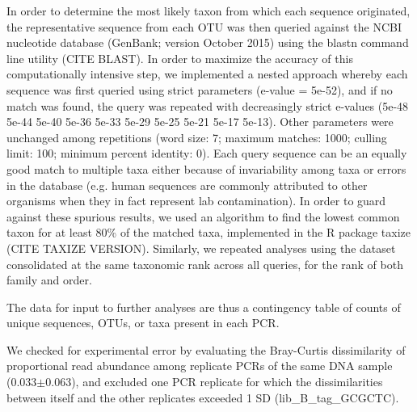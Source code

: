 \documentclass[11pt,letterpaper]{article} %
\begin{document}
In order to determine the most likely taxon from which each sequence originated, the representative sequence from each OTU was then queried against the NCBI nucleotide database (GenBank; version October 2015) using the blastn command line utility (CITE BLAST).
In order to maximize the accuracy of this computationally intensive step, we implemented a nested approach whereby each sequence was first queried using strict parameters (e-value = 5e-52), and if no match was found, the query was repeated with decreasingly strict e-values (5e-48 5e-44 5e-40 5e-36 5e-33 5e-29 5e-25 5e-21 5e-17 5e-13).
Other parameters were unchanged among repetitions (word size: 7; maximum matches: 1000; culling limit: 100; minimum percent identity: 0).
Each query sequence can be an equally good match to multiple taxa either because of invariability among taxa or errors in the database (e.g. human sequences are commonly attributed to other organisms when they in fact represent lab contamination).
In order to guard against these spurious results, we used an algorithm to find the lowest common taxon for at least 80\% of the matched taxa, implemented in the R package taxize (CITE TAXIZE VERSION).
Similarly, we repeated analyses using the dataset consolidated at the same taxonomic rank across all queries, for the rank of both family and order.

The data for input to further analyses are thus a contingency table of counts of unique sequences, OTUs, or taxa present in each PCR.

We checked for experimental error by evaluating the Bray-Curtis dissimilarity of proportional read abundance among replicate PCRs of the same DNA sample (0.033$\pm$0.063), and excluded one PCR replicate for which the dissimilarities between itself and the other replicates exceeded 1 SD (lib\_B\_tag\_GCGCTC).


%
%
%
%
\end{document}
